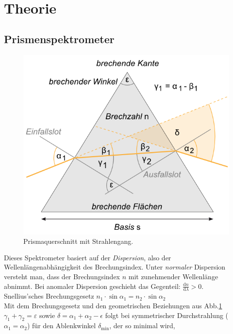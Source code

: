 \documentclass[12pt,a4paper,titlepage,headinclude,bibtotoc]{scrartcl}
\newcommand{\dif}{\ensuremath{\mathrm{d}}}
\begin{document}
\section{Theorie}
\label{sec:theorie}
\subsection{Prismenspektrometer}

\begin{figure}[!h]
	\centering
	\includegraphics[scale=0.6]{Prisma.png}
	\caption{Prismaquerschnitt mit Strahlengang. \cite[Datum: 28.12.2014]{LP19}}
	\label{fig:prisma}
\end{figure}
Dieses Spektrometer basiert auf der \textit{Dispersion}, also der Wellenlängenabhängigkeit des Brechungsindex.
Unter \textit{normaler} Dispersion versteht man, dass der Brechungsindex $n$ mit zunehmender Wellenlänge abnimmt.
Bei anomaler Dispersion geschieht das Gegenteil: $\frac{\dif n}{\dif \lambda} > 0$.\\

Snellius'sches Brechungsgesetz $n_1\cdot\sin\alpha_1=n_2\cdot\sin\alpha_2$\\

Mit dem Brechungsgesetz  und den geometrischen Beziehungen aus Abb.\ref{fig:prisma} $\gamma_1+\gamma_2=\varepsilon$ sowie $\delta=\alpha_1+\alpha_2-\epsilon$ folgt bei symmetrischer Durchstrahlung ($\alpha_1=\alpha_2$) für den Ablenkwinkel $\delta_\text{min}$, der so minimal wird,
\end{document}

